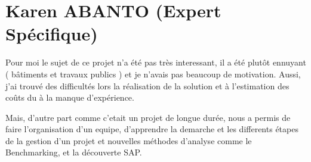 \section{Karen ABANTO (Expert Spécifique)}

Pour moi le sujet de ce projet n'a été pas très interessant, il a été plutôt
 ennuyant ( bâtiments et travaux publics )
et je n'avais pas beaucoup de motivation. Aussi, j'ai trouvé des 
difficultés lors la réalisation de la solution 
et à l'estimation des coûts du à la manque d'expérience. 

Mais, d'autre part comme c'etait un projet de longue durée, nous a permis de 
faire l'organisation d'un equipe, 
d'apprendre la demarche et les differents étapes de la gestion d'un projet 
et nouvelles méthodes d'analyse
comme le Benchmarking, et la découverte SAP.






